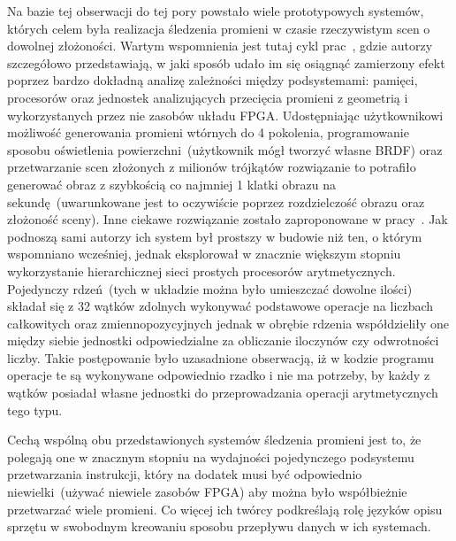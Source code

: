 Na bazie tej obserwacji do tej pory powstało wiele prototypowych systemów, których celem była realizacja śledzenia promieni w czasie rzeczywistym scen o dowolnej złożoności. Wartym wspomnienia jest tutaj cykl prac~\cite{Realtime_FPGA}\cite{RPU}\cite{Realtime_ASIC}, gdzie autorzy szczegółowo przedstawiają, w jaki sposób udało im się osiągnąć zamierzony efekt poprzez bardzo dokładną analizę zależności między podsystemami: pamięci, procesorów oraz jednostek analizujących przecięcia promieni z geometrią i wykorzystanych przez nie zasobów układu FPGA. Udostępniając użytkownikowi możliwość generowania promieni wtórnych do 4 pokolenia, programowanie sposobu oświetlenia powierzchni~(użytkownik mógł tworzyć własne BRDF) oraz przetwarzanie scen złożonych z milionów trójkątów rozwiązanie to potrafiło generować obraz z szybkością co najmniej 1 klatki obrazu na sekundę~(uwarunkowane jest to oczywiście poprzez rozdzielczość obrazu oraz złożoność sceny). Inne ciekawe rozwiązanie zostało zaproponowane w pracy~\cite{TRAX}. Jak podnoszą sami autorzy ich system był prostszy w budowie niż ten, o którym wspomniano wcześniej, jednak eksplorował w znacznie większym stopniu wykorzystanie hierarchicznej sieci prostych procesorów arytmetycznych. Pojedynczy rdzeń~(tych w układzie można było umieszczać dowolne ilości) składał się z 32 wątków zdolnych wykonywać podstawowe operacje na liczbach całkowitych oraz zmiennopozycyjnych jednak w obrębie rdzenia współdzieliły one między siebie jednostki odpowiedzialne za obliczanie iloczynów czy odwrotności liczby. Takie postępowanie było uzasadnione obserwacją, iż w kodzie programu operacje te są wykonywane odpowiednio rzadko i nie ma potrzeby, by każdy z wątków posiadał własne jednostki do przeprowadzania operacji arytmetycznych tego typu.

Cechą wspólną obu przedstawionych systemów śledzenia promieni jest to, że polegają one w znacznym stopniu na wydajności pojedynczego podsystemu przetwarzania instrukcji, który na dodatek musi być odpowiednio niewielki~(używać niewiele zasobów FPGA) aby można było współbieżnie przetwarzać wiele promieni. Co więcej ich twórcy podkreślają rolę języków opisu sprzętu w swobodnym kreowaniu sposobu przepływu danych w ich systemach.

